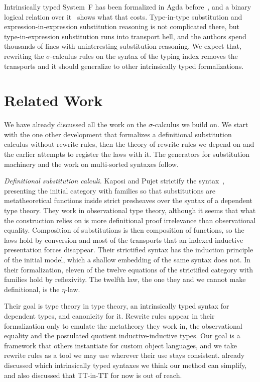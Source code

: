 \documentclass[sigplan,anonymous,review]{acmart}
\theoremstyle{acmdefinition}
\begin{document}
Intrinsically typed System~F has been formalized in Agda
before~\cite{10.1007/978-3-030-33636-3_10}, and a binary logical relation over
it~\cite{10.1145/3678000.3678201} shows what that costs. Type-in-type
substitution and expression-in-expression substitution reasoning is not
complicated there, but type-in-expression substitution runs into transport
hell, and the authors spend thousands of lines with uninteresting substitution
reasoning. We expect that, rewriting the $σ$-calculus rules on the syntax of the typing index
removes the transports and it should generalize to other intrinsically typed
formalizations. 

\section{Related Work}\label{sec:rwk}

We have already discussed all the work on the $σ$-calculus we build on. We
start with the one other development that formalizes a definitional
substitution calculus without rewrite rules, then the theory of rewrite rules
we depend on and the earlier attempts to register the laws with it. The
generators for substitution machinery and the work on multi-sorted syntaxes
follow.

\emph{Definitional substitution calculi.} Kaposi and Pujet strictify the
syntax~\cite{10.1145/3747535}, presenting the initial category with families
so that substitutions are metatheoretical functions inside strict presheaves
over the syntax of a dependent type theory. They work in observational type
theory, although it seems that what the construction relies on is more
definitional proof irrelevance than observational equality. Composition of
substitutions is then composition of functions, so the laws hold by conversion
and most of the transports that an indexed-inductive presentation forces
disappear. Their strictified syntax has the induction principle of the initial
model, which a shallow embedding of the same syntax does not. In their
formalization, eleven of the twelve equations of the strictified category with
families hold by reflexivity. The twelfth law, the one they and we cannot make
definitional, is the $\eta$-law.

Their goal is type theory in type theory, an intrinsically typed syntax for
dependent types, and canonicity for it. Rewrite rules appear in their
formalization only to emulate the metatheory they work in, the observational
equality and the postulated quotient inductive-inductive types. Our goal is a
framework that others instantiate for custom object languages, and we take
rewrite rules as a tool we may use wherever their use stays consistent.
 already discussed which intrinsically typed syntaxes we
think our method can simplify, and also discussed that TT-in-TT for now is out
of reach.
\end{document}
